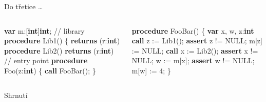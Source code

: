 \documentclass[11pt]{beamer}
\begin{document}
\begin{frame}[fragile]{Do třetice \ldots}
\begin{columns}

\begin{column}{0.5\textwidth}
\begin{semiverbatim}
\textbf{var} m:[\textbf{int}]\textbf{int};
\pause
// library
\textbf{procedure} Lib1() \{
  \textbf{returns} (r:\textbf{int})
\textbf{procedure} Lib2()
  \textbf{returns} (r:\textbf{int})
\pause
// entry point
\textbf{procedure} Foo(z:\textbf{int}) \{
  \textbf{call} FooBar();
\}
\end{semiverbatim}
\end{column}

\begin{column}{0.5\textwidth}
\begin{semiverbatim}
\pause
\textbf{procedure} FooBar() \{
  \textbf{var} x, w, z:\textbf{int}\pause\onslide<+->
  \textbf{call} z := Lib1();\onslide<+->
  \textbf{assert} z != NULL;\pause\onslide<+->
  m[z] := NULL;\onslide<+->
  \textbf{call} x := Lib2();\onslide<+->
  \textbf{assert} x != NULL;\pause\onslide<+->
  w := m[x];\onslide<+->
  \textbf{assert} w != NULL;\pause\onslide<+->
  m[w] := 4;
\}
\end{semiverbatim}
\end{column}

\end{columns}
\end{frame}

\begin{frame}{Shrnutí}

\end{frame}

\end{document}
